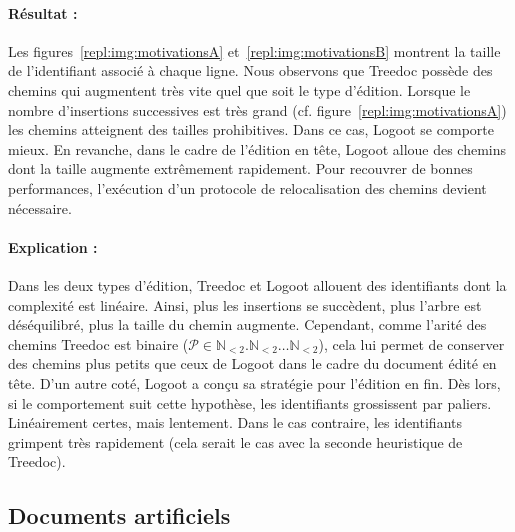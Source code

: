 \paragraph{Résultat :} Les figures~\ref{repl:img:motivationsA}
et~\ref{repl:img:motivationsB} montrent la taille de l'identifiant associé à
chaque ligne. Nous observons que Treedoc possède des chemins qui augmentent très
vite quel que soit le type d'édition. Lorsque le nombre d'insertions successives
est très grand (cf. figure~\ref{repl:img:motivationsA}) les chemins atteignent
des tailles prohibitives. Dans ce cas, Logoot se comporte mieux. En revanche,
dans le cadre de l'édition en tête, Logoot alloue des chemins dont la taille
augmente extrêmement rapidement. Pour recouvrer de bonnes performances,
l'exécution d'un protocole de relocalisation des chemins devient nécessaire.

\paragraph{Explication :} Dans les deux types d'édition, Treedoc et Logoot
allouent des identifiants dont la complexité est linéaire. Ainsi, plus les
insertions se succèdent, plus l'arbre est déséquilibré, plus la taille du chemin
augmente. Cependant, comme l'arité des chemins Treedoc est binaire
($\mathcal{P}\in \mathbb{N}_{<2}.\mathbb{N}_{<2}\ldots\mathbb{N}_{<2}$), cela
lui permet de conserver des chemins plus petits que ceux de Logoot dans le cadre
du document édité en tête. D'un autre coté, Logoot a conçu sa stratégie pour
l'édition en fin. Dès lors, si le comportement suit cette hypothèse, les
identifiants grossissent par paliers. Linéairement certes, mais lentement. Dans
le cas contraire, les identifiants grimpent très rapidement (cela serait le cas
avec la seconde heuristique de Treedoc).

\subsection{Documents artificiels}



